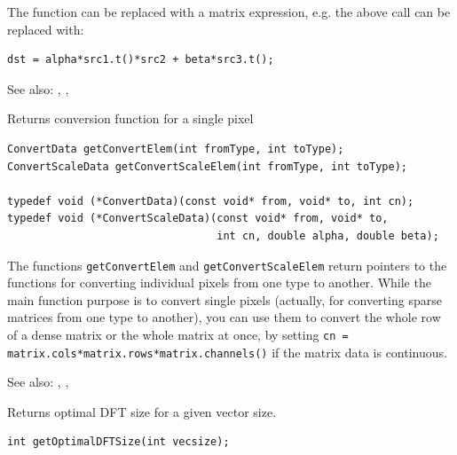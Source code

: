 The function can be replaced with a matrix expression, e.g. the above call can be replaced with:
\begin{lstlisting}
dst = alpha*src1.t()*src2 + beta*src3.t();
\end{lstlisting}

See also: , , 


\label{getConvertElem}
Returns conversion function for a single pixel

\begin{lstlisting}
ConvertData getConvertElem(int fromType, int toType);
ConvertScaleData getConvertScaleElem(int fromType, int toType);

typedef void (*ConvertData)(const void* from, void* to, int cn);
typedef void (*ConvertScaleData)(const void* from, void* to,
                                 int cn, double alpha, double beta);
\end{lstlisting}
\begin{description}
\end{description}

The functions \texttt{getConvertElem} and \texttt{getConvertScaleElem} return pointers to the functions for converting individual pixels from one type to another. While the main function purpose is to convert single pixels (actually, for converting sparse matrices from one type to another), you can use them to convert the whole row of a dense matrix or the whole matrix at once, by setting \texttt{cn = matrix.cols*matrix.rows*matrix.channels()} if the matrix data is continuous.

See also: , , 


\label{getOptimalDFTSize}
Returns optimal DFT size for a given vector size.

\begin{lstlisting}
int getOptimalDFTSize(int vecsize);
\end{lstlisting}
\begin{description}
\end{description}

